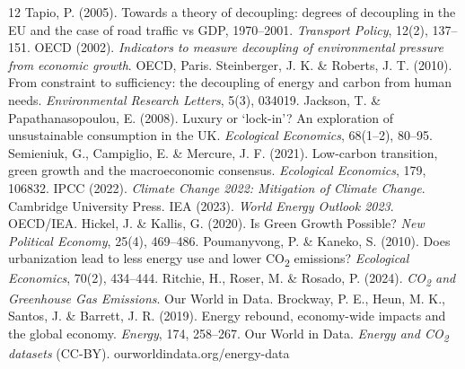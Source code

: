 \documentclass[11pt]{article}
\begin{document}
\begin{thebibliography}{12}
 Tapio, P. (2005). Towards a theory of decoupling: degrees of decoupling in the EU and the case of road traffic vs GDP, 1970--2001. \emph{Transport Policy}, 12(2), 137--151.
 OECD (2002). \emph{Indicators to measure decoupling of environmental pressure from economic growth}. OECD, Paris.
 Steinberger, J. K. \& Roberts, J. T. (2010). From constraint to sufficiency: the decoupling of energy and carbon from human needs. \emph{Environmental Research Letters}, 5(3), 034019.
 Jackson, T. \& Papathanasopoulou, E. (2008). Luxury or `lock-in'? An exploration of unsustainable consumption in the UK. \emph{Ecological Economics}, 68(1--2), 80--95.
 Semieniuk, G., Campiglio, E. \& Mercure, J. F. (2021). Low-carbon transition, green growth and the macroeconomic consensus. \emph{Ecological Economics}, 179, 106832.
 IPCC (2022). \emph{Climate Change 2022: Mitigation of Climate Change}. Cambridge University Press.
 IEA (2023). \emph{World Energy Outlook 2023}. OECD/IEA.
 Hickel, J. \& Kallis, G. (2020). Is Green Growth Possible? \emph{New Political Economy}, 25(4), 469--486.
 Poumanyvong, P. \& Kaneko, S. (2010). Does urbanization lead to less energy use and lower CO\textsubscript{2} emissions? \emph{Ecological Economics}, 70(2), 434--444.
 Ritchie, H., Roser, M. \& Rosado, P. (2024). \emph{CO\textsubscript{2} and Greenhouse Gas Emissions}. Our World in Data.
 Brockway, P. E., Heun, M. K., Santos, J. \& Barrett, J. R. (2019). Energy rebound, economy-wide impacts and the global economy. \emph{Energy}, 174, 258--267.
 Our World in Data. \emph{Energy and CO\textsubscript{2} datasets} (CC-BY). ourworldindata.org/energy-data
\end{thebibliography}
\end{document}
